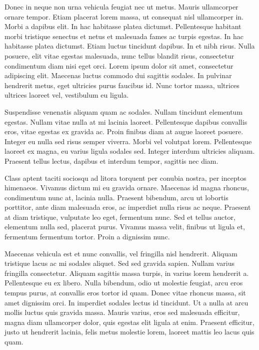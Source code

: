 Donec in neque non urna vehicula feugiat nec ut metus. Mauris ullamcorper ornare tempor. Etiam placerat lorem massa, ut consequat nisl ullamcorper in. Morbi a dapibus elit. In hac habitasse platea dictumst. Pellentesque habitant morbi tristique senectus et netus et malesuada fames ac turpis egestas. In hac habitasse platea dictumst. Etiam luctus tincidunt dapibus. In et nibh risus. Nulla posuere, elit vitae egestas malesuada, nunc tellus blandit risus, consectetur condimentum diam nisi eget orci. Lorem ipsum dolor sit amet, consectetur adipiscing elit. Maecenas luctus commodo dui sagittis sodales. In pulvinar hendrerit metus, eget ultricies purus faucibus id. Nunc tortor massa, ultrices ultrices laoreet vel, vestibulum eu ligula.

Suspendisse venenatis aliquam quam ac sodales. Nullam tincidunt elementum egestas. Nullam vitae nulla at mi lacinia laoreet. Pellentesque dapibus convallis eros, vitae egestas ex gravida ac. Proin finibus diam at augue laoreet posuere. Integer eu nulla sed risus semper viverra. Morbi vel volutpat lorem. Pellentesque laoreet ex magna, eu varius ligula sodales sed. Integer interdum ultricies aliquam. Praesent tellus lectus, dapibus et interdum tempor, sagittis nec diam.

Class aptent taciti sociosqu ad litora torquent per conubia nostra, per inceptos himenaeos. Vivamus dictum mi eu gravida ornare. Maecenas id magna rhoncus, condimentum nunc at, lacinia nulla. Praesent bibendum, arcu ut lobortis porttitor, ante diam malesuada eros, ac imperdiet nulla risus ac neque. Praesent at diam tristique, vulputate leo eget, fermentum nunc. Sed et tellus auctor, elementum nulla sed, placerat purus. Vivamus massa velit, finibus ut ligula et, fermentum fermentum tortor. Proin a dignissim nunc.

Maecenas vehicula est et nunc convallis, vel fringilla nisl hendrerit. Aliquam tristique lacus ac mi sodales aliquet. Sed sed gravida sapien. Nullam varius fringilla consectetur. Aliquam sagittis massa turpis, in varius lorem hendrerit a. Pellentesque eu ex libero. Nulla bibendum, odio ut molestie feugiat, arcu eros tempus purus, at convallis eros tortor id quam. Donec vitae rhoncus massa, sit amet dignissim orci. In imperdiet sodales lectus id tincidunt. Ut a nulla at arcu mollis luctus quis gravida massa. Mauris varius, eros sed malesuada efficitur, magna diam ullamcorper dolor, quis egestas elit ligula at enim. Praesent efficitur, justo ut hendrerit lacinia, felis metus molestie lorem, laoreet mattis leo lacus quis quam.

